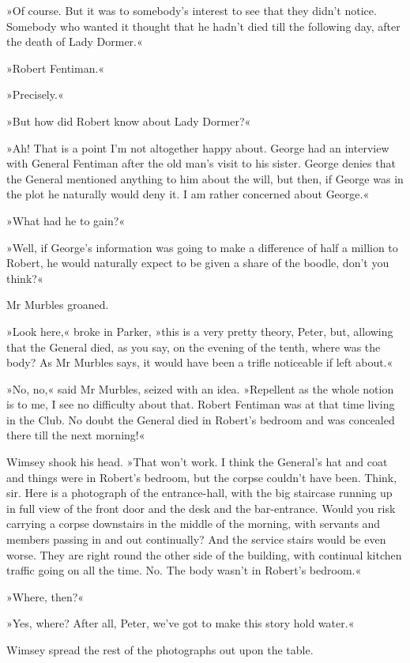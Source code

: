 »Of course. But it was to somebody's interest to see that they didn't notice. Somebody who wanted it thought that he hadn't died till the following day, after the death of Lady Dormer.«

»Robert Fentiman.«

»Precisely.«

»But how did Robert know about Lady Dormer?«

»Ah! That is a point I'm not altogether happy about. George had an interview with General Fentiman after the old man's visit to his sister. George denies that the General mentioned anything to him about the will, but then, if George was in the plot he naturally would deny it. I am rather concerned about George.«

»What had he to gain?«

»Well, if George's information was going to make a difference of half a million to Robert, he would naturally expect to be given a share of the boodle, don't you think?«

Mr Murbles groaned.

»Look here,« broke in Parker, »this is a very pretty theory, Peter, but, allowing that the General died, as you say, on the evening of the tenth, where was the body? As Mr Murbles says, it would have been a trifle noticeable if left about.«

»No, no,« said Mr Murbles, seized with an idea. »Repellent as the whole notion is to me, I see no difficulty about that. Robert Fentiman was at that time living in the Club. No doubt the General died in Robert's bedroom and was concealed there till the next morning!«

Wimsey shook his head. »That won't work. I think the General's hat and coat and things were in Robert's bedroom, but the corpse couldn't have been. Think, sir. Here is a photograph of the entrance-hall, with the big staircase running up in full view of the front door and the desk and the bar-entrance. Would you risk carrying a corpse downstairs in the middle of the morning, with servants and members passing in and out continually? And the service stairs would be even worse. They are right round the other side of the building, with continual kitchen traffic going on all the time. No. The body wasn't in Robert's bedroom.«

»Where, then?«

»Yes, where? After all, Peter, we've got to make this story hold water.«

Wimsey spread the rest of the photographs out upon the table.

